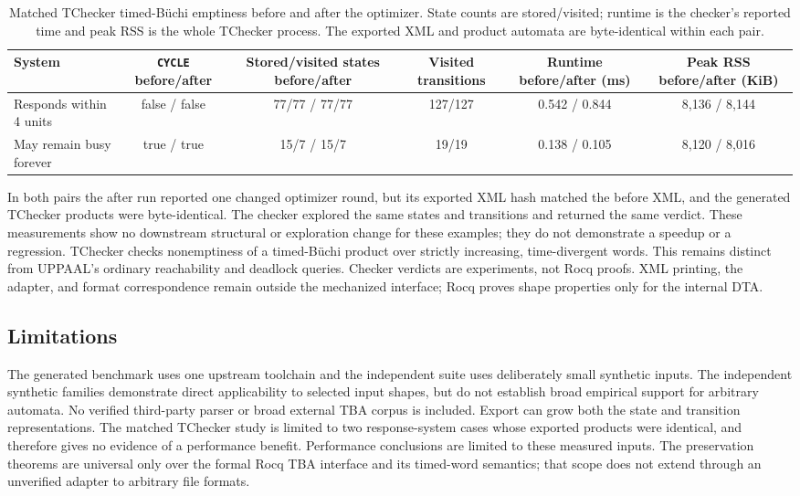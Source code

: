 \begin{table}[t]
\centering
\caption{Matched TChecker timed-B\"uchi emptiness before and after the optimizer. State counts are stored/visited; runtime is the checker's reported time and peak RSS is the whole TChecker process. The exported XML and product automata are byte-identical within each pair.}
\label{tab:tchecker-before-after}
\scriptsize
\begin{tabular}{@{}lccccc@{}}
\toprule
System & \texttt{CYCLE} before/after & Stored/visited states before/after & Visited transitions & Runtime before/after (ms) & Peak RSS before/after (KiB)\\
\midrule
Responds within 4 units & false / false & 77/77 / 77/77 & 127/127 & 0.542 / 0.844 & 8,136 / 8,144\\
May remain busy forever & true / true & 15/7 / 15/7 & 19/19 & 0.138 / 0.105 & 8,120 / 8,016\\
\bottomrule
\end{tabular}
\end{table}

In both pairs the after run reported one changed optimizer round, but its
exported XML hash matched the before XML, and the generated TChecker products
were byte-identical. The checker explored the same states and transitions
and returned the same verdict. These measurements show no downstream
structural or exploration change for these examples; they do not demonstrate
a speedup or a regression. TChecker checks nonemptiness of a timed-B\"uchi
product over strictly increasing, time-divergent words. This remains distinct
from UPPAAL's ordinary reachability and deadlock queries. Checker verdicts
are experiments, not Rocq proofs. XML printing, the adapter, and format
correspondence remain outside the mechanized interface; Rocq proves shape
properties only for the internal DTA.

\subsection{Limitations}
The generated benchmark uses one upstream toolchain and the independent
suite uses deliberately small synthetic inputs. The independent synthetic
families demonstrate direct applicability to selected input shapes,
but do not establish broad empirical support for arbitrary automata. No
verified third-party parser or broad external TBA corpus is included. Export can grow both the
state and transition representations. The matched TChecker study is limited
to two response-system cases whose exported products were identical, and
therefore gives no evidence of a performance benefit. Performance conclusions are limited to
these measured inputs. The preservation theorems are universal only over the
formal Rocq TBA interface and its timed-word semantics; that scope does not
extend through an unverified adapter to arbitrary file formats.

